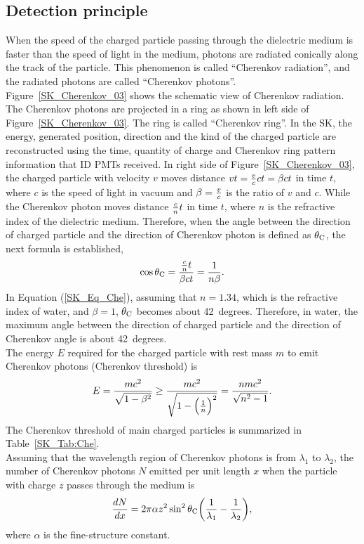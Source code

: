 \subsection{Detection principle}\label{subsec_detect_princi}
\vs\hs
When the speed of the charged particle passing through the dielectric medium is faster than the speed of light in the medium, photons are radiated conically along the track of the particle.
This phenomenon is called ``Cherenkov radiation'', and the radiated photons are called ``Cherenkov photons''.
Figure~\ref{SK_Cherenkov_03} shows the schematic view of Cherenkov radiation.
The Cherenkov photons are projected in a ring as shown in left side of Figure~\ref{SK_Cherenkov_03}.
The ring is called ``Cherenkov ring''.
In the SK, the energy, generated position, direction and the kind of the charged particle are reconstructed using the time, quantity of charge and Cherenkov ring pattern information that ID PMTs received.
In right side of Figure~\ref{SK_Cherenkov_03}, the charged particle with velocity $v$ moves distance $vt={v \over c}ct=\beta ct$ in time $t$, where $c$ is the speed of light in vacuum and $\beta={v \over c}$ is the ratio of $v$ and $c$.
While the Cherenkov photon moves distance ${c \over n}t$ in time $t$, where $n$ is the refractive index of the dielectric medium.
Therefore, when the angle between the direction of charged particle and the direction of Cherenkov photon is defined as $\theta_{{\rm C}}$, the next formula is established,
\begin{eqnarray}\label{SK_Eq_Che}
	\cos\theta_{{\rm C}}={{c \over n}t \over \beta ct}={1 \over n\beta}.
\end{eqnarray}
In Equation (\ref{SK_Eq_Che}), assuming that $n=1.34$, which is the refractive index of water, and $\beta=1$, $\theta_{{\rm C}}$ becomes about 42~degrees.
Therefore, in water, the maximum angle between the direction of charged particle and the direction of Cherenkov angle is about 42~degrees.\\
\hs
The energy $E$ required for the charged particle with rest mass $m$ to emit Cherenkov photons (Cherenkov threshold) is
\begin{eqnarray}
	E={mc^{2} \over \sqrt{1-\beta^{2}}}\geq{mc^{2} \over \sqrt{1-\Big({1 \over n}\Big)^{2}}}={nmc^{2} \over \sqrt{n^{2}-1}}.
\end{eqnarray}
The Cherenkov threshold of main charged particles is summarized in Table~\ref{SK_Tab:Che}.\\
\hs
Assuming that the wavelength region of Cherenkov photons is from $\lambda_{1}$ to $\lambda_{2}$, the number of Cherenkov photons $N$ emitted per unit length $x$ when the particle with charge $z$ passes through the medium is
\begin{eqnarray}
	{dN \over dx}=2\pi\alpha z^{2}\sin ^{2} \theta_{{\rm C}}\bigg({1 \over \lambda_{1}}-{1 \over \lambda_{2}}\bigg),
\end{eqnarray}
where $\alpha$ is the fine-structure constant.

